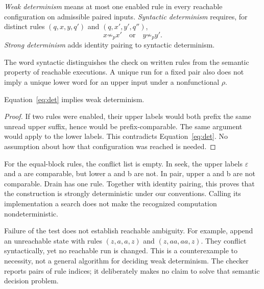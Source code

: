 \begin{definition}
\emph{Weak determinism} means at most one enabled rule in every reachable
configuration on admissible paired inputs. \emph{Syntactic determinism}
requires, for distinct rules $(q,x,y,q')$ and $(q,x',y',q'')$,
\begin{equation}
 x\not\sim_p x'\quad\text{or}\quad y\not\sim_p y'.
 \label{eq:det}
\end{equation}
\emph{Strong determinism} adds identity pairing to syntactic determinism.
\end{definition}
The word syntactic distinguishes the check on written rules from the semantic
property of reachable executions. A unique run for a fixed pair also does not
imply a unique lower word for an upper input under a nonfunctional $\rho$.

\begin{proposition}
Equation~\ref{eq:det} implies weak determinism.
\end{proposition}
\begin{proof}
If two rules were enabled, their upper labels would both prefix the same
unread upper suffix, hence would be prefix-comparable. The same argument
would apply to the lower labels. This contradicts Equation~\ref{eq:det}.
No assumption about how that configuration was reached is needed.
\end{proof}


For the equal-block rules, the conflict list is empty. In seek, the upper
labels $\varepsilon$ and a are comparable, but lower a and b are not.
In pair, upper a and b are not comparable. Drain has one rule. Together
with identity pairing, this proves that the construction is strongly
deterministic under our conventions. Calling its implementation a search
does not make the recognized computation nondeterministic.

Failure of the test does not establish reachable ambiguity. For example,
append an unreachable state with rules $(z,a,a,z)$ and $(z,aa,aa,z)$.
They conflict syntactically, yet no reachable run is changed. This is a
counterexample to necessity, not a general algorithm for deciding weak
determinism. The checker reports pairs of rule indices; it deliberately
makes no claim to solve that semantic decision problem.

